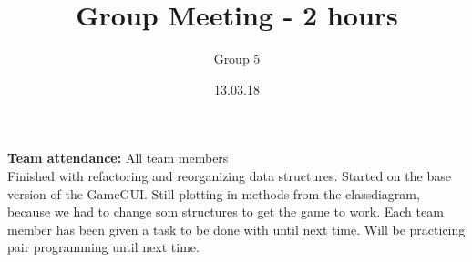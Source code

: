 \documentclass{article}
\title{Group Meeting - 2 hours}
\author{Group 5}
\date{13.03.18}
\begin{document}
	\maketitle
	\noindent
	\textbf{Team attendance:} All team members \\

	\noindent
	Finished with refactoring and reorganizing data structures. Started on
	the base version of the GameGUI. Still plotting in methods from the classdiagram,
	because we had to change som structures to get the game to work. Each team member has been given a task to be done with until next time.
	Will be practicing pair programming until next time. 
\end{document}
